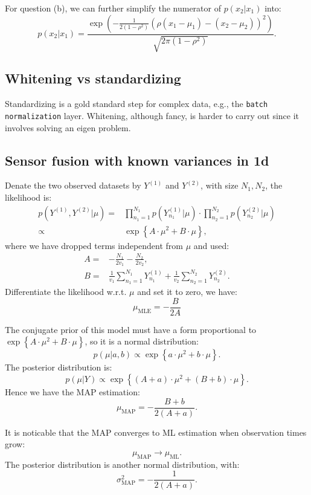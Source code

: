 \documentclass[UTF8]{ctexart}
\begin{document}
For question (b), we can further simplify the numerator of $p(x_{2}|x_{1})$ into:
$$p(x_{2}|x_{1})=\frac{\exp\left(-\frac{1}{2(1-\rho^{2})}\left(\rho(x_{1}-\mu_{1})-(x_{2}-\mu_{2}) \right)^{2} \right)}{\sqrt{2\pi(1-\rho^{2})}}.$$

\subsection{Whitening vs standardizing}
Standardizing is a gold standard step for complex data, e.g., the \texttt{batch normalization} layer.
Whitening, although fancy, is harder to carry out since it involves solving an eigen problem.

\subsection{Sensor fusion with known variances in 1d}
Denate the two observed datasets by $Y^{(1)}$ and $Y^{(2)}$, with size $N_{1},N_{2}$, the likelihood is:
\begin{align}
p(Y^{(1)},Y^{(2)}|\mu)=&\prod_{n_{1}=1}^{N_{1}}p(Y^{(1)}_{n_{1}}|\mu)\cdot\prod_{n_{2}=1}^{N_{2}}p(Y^{(2)}_{n_{2}}|\mu)\nonumber \\
\propto& \exp\left\{ A\cdot \mu^{2} + B \cdot \mu \right\}, \nonumber
\end{align}
where we have dropped terms independent from $\mu$ and used:
\begin{align}
A=&-\frac{N_{1}}{2v_{1}}-\frac{N_{2}}{2v_{2}},\nonumber \\
B=&\frac{1}{v_{1}}\sum_{n_{1}=1}^{N_{1}}Y^{(1)}_{n_{1}} + \frac{1}{v_{2}}\sum_{n_{2}=1}^{N_{2}}Y^{(2)}_{n_{2}}. \nonumber
\end{align}
Differentiate the likelihood w.r.t. $\mu$ and set it to zero, we have:
$$\mu_{\text{MLE}} = -\frac{B}{2A}$$

The conjugate prior of this model must have a form proportional to $\exp\left\{A\cdot\mu^{2} + B\cdot\mu\right\}$, so it is a normal distribution:
$$p(\mu|a,b) \propto \exp\left\{ a\cdot \mu^{2} + b\cdot \mu \right\}.$$
The posterior distribution is:
$$p(\mu|Y) \propto \exp\left\{ (A+a)\cdot \mu^{2} + (B+b)\cdot \mu \right\}.$$
Hence we have the MAP estimation:
$$\mu_{\text{MAP}} = -\frac{B+b}{2(A+a)}.$$

It is noticable that the MAP converges to ML estimation when observation times grow:
$$\mu_{\text{MAP}} \rightarrow \mu_{\text{ML}}.$$
The posterior distribution is another normal distribution, with:
$$\sigma^{2}_{\text{MAP}} = -\frac{1}{2(A+a)}.$$
\end{document}
